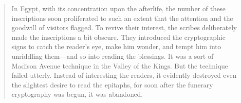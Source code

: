 \begin{quote}
In Egypt, with its concentration upon the afterlife, the number of these inscriptions soon proliferated to such an extent that the attention and the goodwill of visitors flagged. To revive their interest, the scribes deliberately made the inscriptions a bit obscure. They introduced the cryptographic signs to catch the reader's eye, make him wonder, and tempt him into unriddling them—and so into reading the blessings. It was a sort of Madison Avenue technique in the Valley of the Kings. But the technique failed utterly. Instead of interesting the readers, it evidently destroyed even the slightest desire to read the epitaphs, for soon after the funerary cryptography was begun, it was abandoned.
\end{quote}
